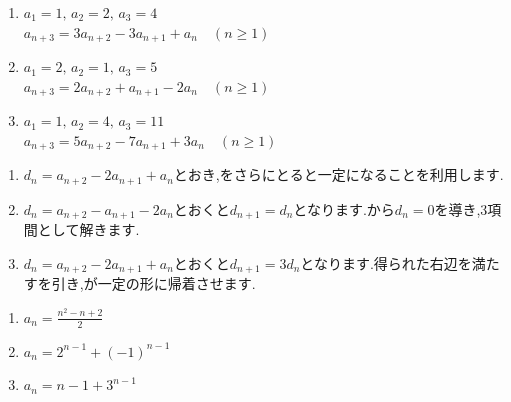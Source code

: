 \noindent {}\par\nobreak
\begin{enumerate}[label=(\arabic*),parsep=3pt,format=\bookitemlink{example-four-term-1}{problem}{answer}]
  \item $\displaystyle a_1=1,\,a_2=2,\,a_3=4$\\
    $a_{n+3}=3a_{n+2}-3a_{n+1}+a_n\quad(n\ge1)$
  \item $\displaystyle a_1=2,\,a_2=1,\,a_3=5$\\
    $a_{n+3}=2a_{n+2}+a_{n+1}-2a_n\quad(n\ge1)$
  \item $\displaystyle a_1=1,\,a_2=4,\,a_3=11$\\
    $a_{n+3}=5a_{n+2}-7a_{n+1}+3a_n\quad(n\ge1)$
\end{enumerate}

\noindent{}\par\nobreak
\begin{enumerate}[label=(\arabic*),parsep=3pt,format=\bookitemlink{example-four-term-1}{hint}{problem}]
  \item $d_n=a_{n+2}-2a_{n+1}+a_n$とおき,をさらにとると一定になることを利用します.
  \item $d_n=a_{n+2}-a_{n+1}-2a_n$とおくと$d_{n+1}=d_n$となります.から$d_n=0$を導き,3項間として解きます.
  \item $d_n=a_{n+2}-2a_{n+1}+a_n$とおくと$d_{n+1}=3d_n$となります.得られた右辺を満たすを引き,が一定の形に帰着させます.
\end{enumerate}

\noindent{}\par\nobreak
\begin{enumerate}[label=(\arabic*),parsep=3pt,format=\bookitemlink{example-four-term-1}{answer}{problem}]
  \item $\displaystyle a_n=\frac{n^2-n+2}{2}$
  \item $\displaystyle a_n=2^{n-1}+(-1)^{n-1}$
  \item $\displaystyle a_n=n-1+3^{n-1}$
\end{enumerate}

